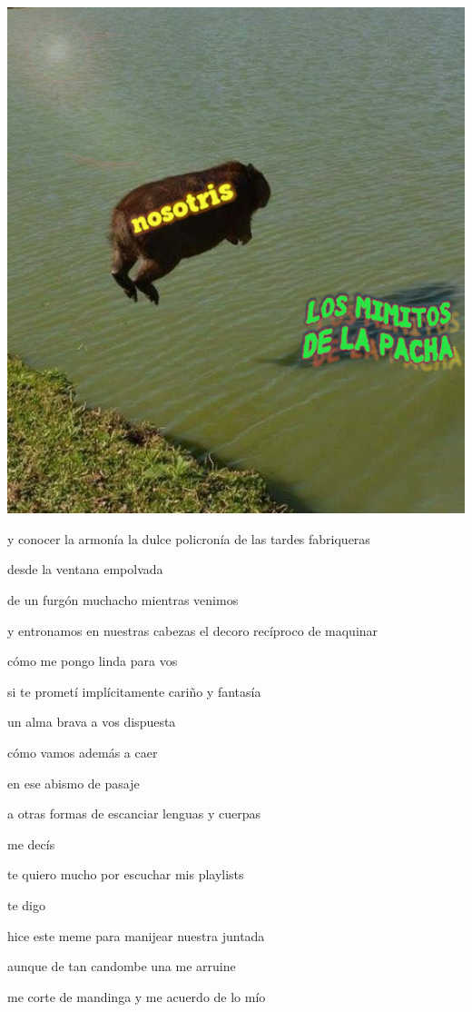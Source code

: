 \documentclass[
]{book}
\begin{document}
\includegraphics{images/16.png}

y conocer la armonía la dulce policronía de las tardes fabriqueras

desde la ventana empolvada

de un furgón muchacho mientras venimos

y entronamos en nuestras cabezas el decoro recíproco de maquinar

cómo me pongo linda para vos

si te prometí implícitamente cariño y fantasía

un alma brava a vos dispuesta

cómo vamos además a caer

en ese abismo de pasaje

a otras formas de escanciar lenguas y cuerpas

me decís

te quiero mucho por escuchar mis playlists

te digo

hice este meme para manijear nuestra juntada

aunque de tan candombe una me arruine

me corte de mandinga y me acuerdo de lo mío
\end{document}
